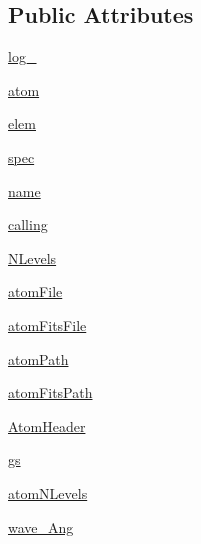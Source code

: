 \subsection*{Public Attributes}
\begin{DoxyCompactItemize}
\item 
\hyperlink{classpyneb_1_1core_1_1pynebcore_1_1___atom_data_fits_a8919598e2830080299dcfe70249d4a15}{log\-\_\-}
\item 
\hyperlink{classpyneb_1_1core_1_1pynebcore_1_1___atom_data_fits_a489ba89fa2e99786afc077e82acace4c}{atom}
\item 
\hyperlink{classpyneb_1_1core_1_1pynebcore_1_1___atom_data_fits_a4724ac766d9c28d48fdcf43f50bd8478}{elem}
\item 
\hyperlink{classpyneb_1_1core_1_1pynebcore_1_1___atom_data_fits_a28f8a716cd11ea24726de792fdfb5573}{spec}
\item 
\hyperlink{classpyneb_1_1core_1_1pynebcore_1_1___atom_data_fits_ac3d861a23f94412d8ae28aeb15a98170}{name}
\item 
\hyperlink{classpyneb_1_1core_1_1pynebcore_1_1___atom_data_fits_a70465eedf1ac0b8e43360bc423be9c93}{calling}
\item 
\hyperlink{classpyneb_1_1core_1_1pynebcore_1_1___atom_data_fits_a85c3a2d0c1cdbecc851be17237caff63}{N\-Levels}
\item 
\hyperlink{classpyneb_1_1core_1_1pynebcore_1_1___atom_data_fits_add12b2ae3c11a68438ebf4bcf79fd6d0}{atom\-File}
\item 
\hyperlink{classpyneb_1_1core_1_1pynebcore_1_1___atom_data_fits_a2523c95ccdad4f27adb19799da3c70b5}{atom\-Fits\-File}
\item 
\hyperlink{classpyneb_1_1core_1_1pynebcore_1_1___atom_data_fits_a2a9232b1a5ad60259d33d934e2cf5bf3}{atom\-Path}
\item 
\hyperlink{classpyneb_1_1core_1_1pynebcore_1_1___atom_data_fits_a6606b085964dbd4011085454b30efe41}{atom\-Fits\-Path}
\item 
\hyperlink{classpyneb_1_1core_1_1pynebcore_1_1___atom_data_fits_a660b5b881aa31dd7dcb6fecfe0735f70}{Atom\-Header}
\item 
\hyperlink{classpyneb_1_1core_1_1pynebcore_1_1___atom_data_fits_ae8ab3604ecbf05c1f668717fc13e9dc2}{gs}
\item 
\hyperlink{classpyneb_1_1core_1_1pynebcore_1_1___atom_data_fits_a4ff73bfa251e1139692c2a60f9821315}{atom\-N\-Levels}
\item 
\hyperlink{classpyneb_1_1core_1_1pynebcore_1_1___atom_data_fits_a904df923201dd16936845199622afc76}{wave\-\_\-\-Ang}
\end{DoxyCompactItemize}
